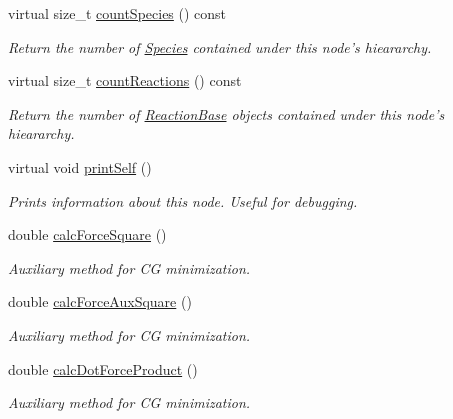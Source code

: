 \begin{DoxyCompactItemize}
virtual size\+\_\+t \hyperlink{classComponent_ae4b35cc8ce749e1219bec0eeea16b4bc}{count\+Species} () const 
\begin{DoxyCompactList}\small\item\em Return the number of \hyperlink{classSpecies}{Species} contained under this node's hieararchy. \end{DoxyCompactList}\item 
virtual size\+\_\+t \hyperlink{classComponent_a446ee3fa9e36a6b56642a9d2a14d983d}{count\+Reactions} () const 
\begin{DoxyCompactList}\small\item\em Return the number of \hyperlink{classReactionBase}{Reaction\+Base} objects contained under this node's hieararchy. \end{DoxyCompactList}\item 
virtual void \hyperlink{classComponent_a871fbdc783ea600ed667dd37eb8adf1e}{print\+Self} ()
\begin{DoxyCompactList}\small\item\em Prints information about this node. Useful for debugging. \end{DoxyCompactList}\end{DoxyCompactItemize}
{\bf }\par
\begin{DoxyCompactItemize}
\item 
double \hyperlink{classBead_a8f10459bad94f72599f2e239644c4421}{calc\+Force\+Square} ()
\begin{DoxyCompactList}\small\item\em Auxiliary method for C\+G minimization. \end{DoxyCompactList}\item 
double \hyperlink{classBead_a82e3c084cb26f343b5de59619c854f2b}{calc\+Force\+Aux\+Square} ()
\begin{DoxyCompactList}\small\item\em Auxiliary method for C\+G minimization. \end{DoxyCompactList}\item 
double \hyperlink{classBead_a3df6e55d379663d002c73651a24718f5}{calc\+Dot\+Force\+Product} ()
\begin{DoxyCompactList}\small\item\em Auxiliary method for C\+G minimization. \end{DoxyCompactList}\end{DoxyCompactItemize}


